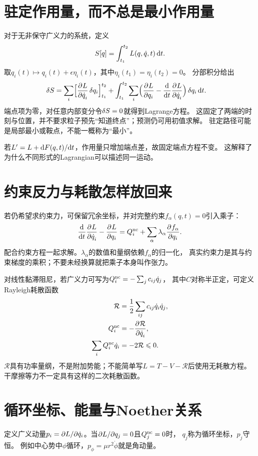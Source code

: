 \section{驻定作用量，而不总是最小作用量}
对于无非保守广义力的系统，定义
\begin{equation}
 S[q] = \int_{t_1}^{t_2}L(q,\dot q,t)\mathop{}\!\mathrm{d} t.
\end{equation}
取$q_i(t) \mapsto q_i(t) + \epsilon\eta_i(t)$，其中$\eta_i(t_1) = \eta_i(t_2) = 0$。
分部积分给出
\begin{align}
 \mathop{}\!\delta S
 &= \sum_i\Bigl[\frac{\partial^{}L}{\partial{\dot q_i}^{}}\mathop{}\!\delta q_i\Bigr]_{t_1}^{t_2}
 + \int_{t_1}^{t_2}\sum_i\Bigl(\frac{\partial^{}L}{\partial{q_i}^{}} - \frac{\mathop{}\!\mathrm{d}^{}}{\mathrm{d}{t}^{}}\frac{\partial^{}L}{\partial{\dot q_i}^{}}\Bigr)\mathop{}\!\delta q_i\mathop{}\!\mathrm{d} t.
\end{align}
端点项为零，对任意内部变分令$\mathop{}\!\delta S = 0$就得到Lagrange方程。
这固定了两端的时刻与位置，并不要求粒子预先“知道终点”；预测仍可用初值求解。
驻定路径可能是局部最小或鞍点，不能一概称为“最小”。

若$L' = L + \mathop{}\!\mathrm{d} F(q,t)/\mathrm{d} t$，作用量只增加端点差，故固定端点方程不变。
这解释了为什么不同形式的Lagrangian可以描述同一运动。

\section{约束反力与耗散怎样放回来}
若仍希望求约束力，可保留冗余坐标，并对完整约束$f_\alpha(q,t) = 0$引入乘子：
\begin{equation}
 \frac{\mathop{}\!\mathrm{d}^{}}{\mathrm{d}{t}^{}}\frac{\partial^{}L}{\partial{\dot q_i}^{}} - \frac{\partial^{}L}{\partial{q_i}^{}}
 = Q_i^{\mathrm{nc}} + \sum_\alpha\lambda_\alpha\frac{\partial^{}f_\alpha}{\partial{q_i}^{}}.
\end{equation}
配合约束方程一起求解。$\lambda_\alpha$的数值和量纲依赖$f_\alpha$的归一化，
真实约束力是其与约束梯度的乘积；不要未经换算就把乘子本身叫作张力。

对线性黏滞阻尼，若广义力可写为$\textstyle Q_i^{\mathrm{nc}} = -\sum_jc_{ij}\dot q_j$，
其中$C$对称半正定，可定义Rayleigh耗散函数
\begin{subequations}
 \begin{align}
  \mathcal R &= \frac12\sum_{ij}c_{ij}\dot q_i\dot q_j,\\
  Q_i^{\mathrm{nc}} &= -\frac{\partial^{}\mathcal R}{\partial{\dot q_i}^{}},\\
  \sum_iQ_i^{\mathrm{nc}}\dot q_i &= -2\mathcal R \leqslant 0.
 \end{align}
\end{subequations}
$\mathcal R$具有功率量纲，不是附加势能；不能简单写$L = T - V - \mathcal R$后使用无耗散方程。
干摩擦等力不一定具有这样的二次耗散函数。

\section{循环坐标、能量与Noether关系}
定义广义动量$p_i = \partial L/\partial\dot q_i$。当$\partial L/\partial q_j = 0$且$Q_j^{\mathrm{nc}} = 0$时，
$q_j$称为循环坐标，$p_j$守恒。
例如中心势中$\phi$循环，$p_\phi = \mu r^2\dot\phi$就是角动量。

